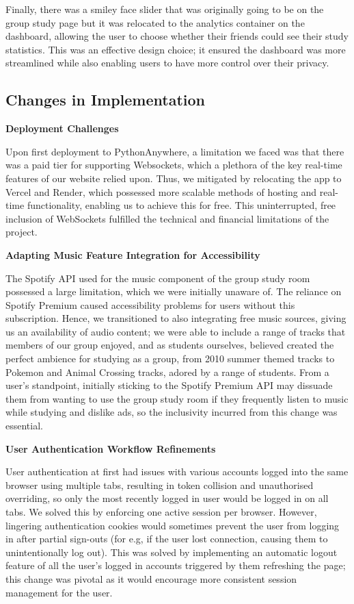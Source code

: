 Finally, there was a smiley face slider that was originally going to be on the group study page but it was relocated to the analytics container on the dashboard, allowing the user to choose whether their friends could see their study statistics. This was an effective design choice; it ensured the dashboard was more streamlined while also enabling users to have more control over their privacy. 

\subsection{Changes in Implementation}
\textbf{Deployment Challenges} 

Upon first deployment to PythonAnywhere, a limitation we faced was that there was a paid tier for supporting Websockets, which a plethora of the key real-time features of our website relied upon. Thus, we mitigated by relocating the app to Vercel and Render, which possessed more scalable methods of hosting and real-time functionality, enabling us to achieve this for free. This uninterrupted, free inclusion of WebSockets fulfilled the technical and financial limitations of the project.

\textbf{Adapting Music Feature Integration for Accessibility}

The Spotify API used for the music component of the group study room possessed a large limitation, which we were initially unaware of. The reliance on Spotify Premium caused accessibility problems for users without this subscription. Hence, we transitioned to also integrating free music sources, giving us an availability of audio content; we were able to include a range of tracks that members of our group enjoyed, and as students ourselves, believed created the perfect ambience for studying as a group, from 2010 summer themed tracks to Pokemon and Animal Crossing tracks, adored by a range of students. From a user's standpoint, initially sticking to the Spotify Premium API may dissuade them from wanting to use the group study room if they frequently listen to music while studying and dislike ads, so the inclusivity incurred from this change was essential.

\textbf{User Authentication Workflow Refinements}

User authentication at first had issues with various accounts logged into the same browser using multiple tabs, resulting in token collision and unauthorised overriding, so only the most recently logged in user would be logged in on all tabs. We solved this by enforcing one active session per browser. However, lingering authentication cookies would sometimes prevent the user from logging in after partial sign-outs (for e.g, if the user lost connection, causing them to unintentionally log out). This was solved by implementing an automatic logout feature of all the user's logged in accounts triggered by them refreshing the page; this change was pivotal as it would encourage more consistent session management for the user.

